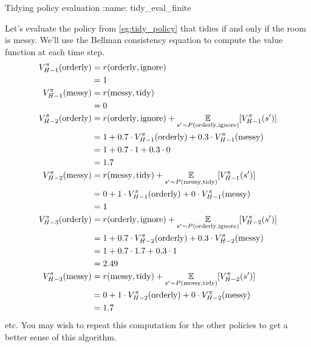 \documentclass[\main/main]{subfiles}
\begin{document}
\begin{example}{Tidying policy evaluation}
:name: tidy_eval_finite

    Let's evaluate the policy from \ref{eg:tidy_policy} that tidies if and only if the room is messy. We'll use the Bellman consistency equation to compute the value function at each time step.
    \begin{align*}
        V_{H-1}^\pi(\text{orderly}) &= r(\text{orderly}, \text{ignore}) \\
        &= 1 \\
        V_{H-1}^\pi(\text{messy}) &= r(\text{messy}, \text{tidy}) \\
        &= 0 \\
        V_{H-2}^\pi(\text{orderly}) &= r(\text{orderly}, \text{ignore}) + \operatorname*{\mathbb{E}}_{s' \sim P(\text{orderly}, \text{ignore})} [V_{H-1}^\pi(s')] \\
        &= 1 + 0.7 \cdot V_{H-1}^{\pi}(\text{orderly}) + 0.3 \cdot V_{H-1}^{\pi}(\text{messy}) \\
        &= 1 + 0.7 \cdot 1 + 0.3 \cdot 0 \\
        &= 1.7 \\
        V_{H-2}^\pi(\text{messy}) &= r(\text{messy}, \text{tidy}) + \operatorname*{\mathbb{E}}_{s' \sim P(\text{messy}, \text{tidy})} [V_{H-1}^\pi(s')] \\
        &= 0 + 1 \cdot V_{H-1}^{\pi}(\text{orderly}) + 0 \cdot V_{H-1}^{\pi}(\text{messy}) \\
        &= 1 \\
        V_{H-3}^\pi(\text{orderly}) &= r(\text{orderly}, \text{ignore}) + \operatorname*{\mathbb{E}}_{s' \sim P(\text{orderly}, \text{ignore})} [V_{H-2}^\pi(s')] \\
        &= 1 + 0.7 \cdot V_{H-2}^{\pi}(\text{orderly}) + 0.3 \cdot V_{H-2}^{\pi}(\text{messy}) \\
        &= 1 + 0.7 \cdot 1.7 + 0.3 \cdot 1 \\
        &= 2.49 \\
        V_{H-3}^\pi(\text{messy}) &= r(\text{messy}, \text{tidy}) + \operatorname*{\mathbb{E}}_{s' \sim P(\text{messy}, \text{tidy})} [V_{H-2}^\pi(s')] \\
        &= 0 + 1 \cdot V_{H-2}^{\pi}(\text{orderly}) + 0 \cdot V_{H-2}^{\pi}(\text{messy}) \\
        &= 1.7
    \end{align*}
    etc. You may wish to repeat this computation for the other policies to get a better sense of this algorithm.
\end{example}
\end{document}
